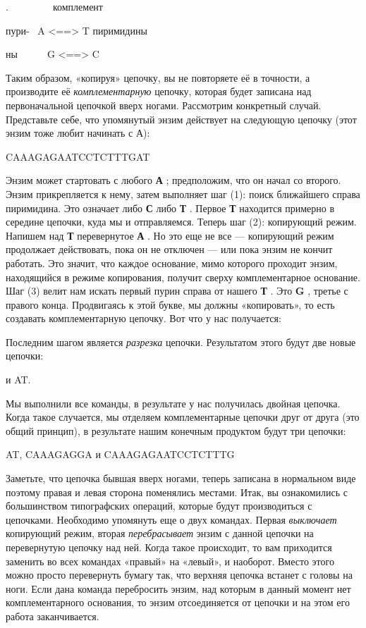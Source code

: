 \documentclass[../main.tex]{subfiles}
\begin{document}
.~~~~~~~~~комплемент

пури- \textbar{} ~A \textless==\textgreater{} T \textbar пиримидины

ны~~~~~\textbar~G \textless==\textgreater{} C \textbar{}

Таким образом, «копируя» цепочку, вы не повторяете её в точности, а производите её \emph{комплементарную} цепочку, которая будет записана над первоначальной цепочкой вверх ногами. Рассмотрим конкретный случай. Представьте себе, что упомянутый энзим действует на следующую цепочку (этот энзим тоже любит начинать с А):

CAAAGAGAATCCTCTTTGAT

Энзим может стартовать с любого \textbf{А} ; предположим, что он начал со второго. Энзим прикрепляется к нему, затем выполняет шаг (1): поиск ближайшего справа пиримидина. Это означает либо \textbf{С} либо \textbf{Т} . Первое \textbf{Т} находится примерно в середине цепочки, куда мы и отправляемся. Теперь шаг (2): копирующий режим. Напишем над \textbf{Т} перевернутое \textbf{А} . Но это еще не все --- копирующий режим продолжает действовать, пока он не отключен --- или пока энзим не кончит работать. Это значит, что каждое основание, мимо которого проходит энзим, находящийся в режиме копирования, получит сверху комплементарное основание. Шаг (3) велит нам искать первый пурин справа от нашего \textbf{Т} . Это \textbf{G} , третье с правого конца. Продвигаясь к этой букве, мы должны «копировать», то есть создавать комплементарную цепочку. Вот что у нас получается:

Последним шагом является \emph{разрезка} цепочки. Результатом этого будут две новые цепочки:

и AT.

Мы выполнили все команды, в результате у нас получилась двойная цепочка. Когда такое случается, мы отделяем комплементарные цепочки друг от друга (это общий принцип), в результате нашим конечным продуктом будут три цепочки:

AT, CAAAGAGGA и CAAAGAGAATCCTCTTTG

Заметьте, что цепочка бывшая вверх ногами, теперь записана в нормальном виде поэтому правая и левая сторона поменялись местами. Итак, вы ознакомились с большинством типографских операций, которые будут производиться с цепочками. Необходимо упомянуть еще о двух командах. Первая \emph{выключает} копирующий режим, вторая \emph{перебрасывает} энзим с данной цепочки на перевернутую цепочку над ней. Когда такое происходит, то вам приходится заменить во всех командах «правый» на «левый», и наоборот. Вместо этого можно просто перевернуть бумагу так, что верхняя цепочка встанет с головы на ноги. Если дана команда перебросить энзим, над которым в данный момент нет комплементарного основания, то энзим отсоединяется от цепочки и на этом его работа заканчивается.
\end{document}
